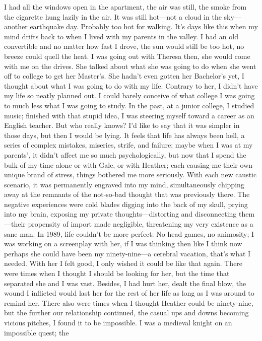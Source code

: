 I had all the windows open in the apartment, the air was still, the
smoke from the cigarette hung lazily in the air. It was still hot---not
a cloud in the sky---another earthquake day. Probably too hot for
walking. It's days like this when my mind drifts back to when I lived
with my parents in the valley. I had an old convertible and no matter
how fast I drove, the sun would still be too hot, no breeze could quell
the heat. I was going out with Theresa then, she would come with me on
the drives. She talked about what she was going to do when she went off
to college to get her Master's. She hadn't even gotten her Bachelor's
yet, I thought about what I was going to do with my life. Contrary to
her, I didn't have my life so neatly planned out. I could barely
conceive of what college I was going to much less what I was going to
study. In the past, at a junior college, I studied music; finished with
that stupid idea, I was steering myself toward a career as an English
teacher. But who really knows? I'd like to say that it was simpler in
those days, but then I would be lying. It feels that life has always
been hell, a series of complex mistakes, miseries, strife, and failure;
maybe when I was at my parents', it didn't affect me so much
psychologically, but now that I spend the bulk of my time alone or with
Gale, or with Heather; each causing me their own unique brand of stress,
things bothered me more seriously. With each new caustic scenario, it
was permanently engraved into my mind, simultaneously chipping away at
the remnants of the not-so-bad thought that was previously there. The
negative experiences were cold blades digging into the back of my skull,
prying into my brain, exposing my private thoughts---distorting and
disconnecting them---their propensity of import made negligible,
threatening my very existence as a sane man. In 1989, life couldn't be
more perfect: No head games, no animosity; I was working on a screenplay
with her, if I was thinking then like I think now perhaps she could have
been my ninety-nine---a cerebral vacation, that's what I needed. With
her I felt good, I only wished it could be like that again. There were
times when I thought I should be looking for her, but the time that
separated she and I was vast. Besides, I had hurt her, dealt the final
blow, the wound I inflicted would last her for the rest of her life as
long as I was around to remind her. There also were times when I thought
Heather could be ninety-nine, but the further our relationship
continued, the casual ups and downs becoming vicious pitches, I found it
to be impossible. I was a medieval knight on an impossible quest; the
